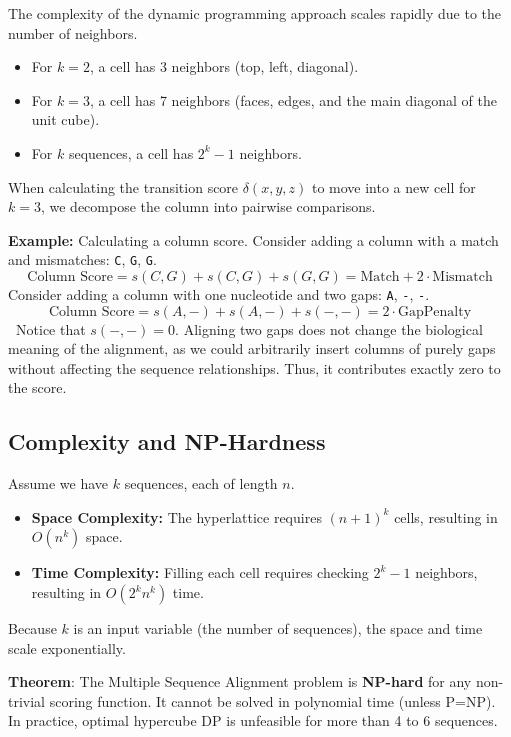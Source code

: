 \documentclass[11pt, a4paper]{article}
\newcommand{\sta}{\textbf{\sffamily [CRITICAL / EXAM]\ }}
\newenvironment{important}
  {\begin{tcolorbox}[colback=blue!5!white, colframe=blue!75!black, arc=1mm, boxrule=1pt]}
  {\end{tcolorbox}}
\begin{document}
The complexity of the dynamic programming approach scales rapidly due to the number of neighbors.
\begin{itemize}
    \item For $k=2$, a cell has 3 neighbors (top, left, diagonal).
    \item For $k=3$, a cell has 7 neighbors (faces, edges, and the main diagonal of the unit cube).
    \item For $k$ sequences, a cell has $2^k - 1$ neighbors.
\end{itemize}

When calculating the transition score $\delta(x, y, z)$ to move into a new cell for $k=3$, we decompose the column into pairwise comparisons. 

\textbf{Example:} Calculating a column score.
Consider adding a column with a match and mismatches: \texttt{C}, \texttt{G}, \texttt{G}. 
\[
\text{Column Score} = s(C,G) + s(C,G) + s(G,G) = \text{Match} + 2 \cdot \text{Mismatch}
\]
Consider adding a column with one nucleotide and two gaps: \texttt{A}, \texttt{-}, \texttt{-}.
\[
\text{Column Score} = s(A,-) + s(A,-) + s(-,-) = 2 \cdot \text{GapPenalty}
\]
\sta Notice that $s(-,-) = 0$. Aligning two gaps does not change the biological meaning of the alignment, as we could arbitrarily insert columns of purely gaps without affecting the sequence relationships. Thus, it contributes exactly zero to the score.

\subsection{Complexity and NP-Hardness}

Assume we have $k$ sequences, each of length $n$.
\begin{itemize}
    \item \textbf{Space Complexity:} The hyperlattice requires $(n+1)^k$ cells, resulting in $O(n^k)$ space.
    \item \textbf{Time Complexity:} Filling each cell requires checking $2^k - 1$ neighbors, resulting in $O(2^k n^k)$ time.
\end{itemize}

Because $k$ is an input variable (the number of sequences), the space and time scale exponentially. 

\begin{important}
  \textbf{Theorem}: The Multiple Sequence Alignment problem is \textbf{NP-hard} for any non-trivial scoring function. It cannot be solved in polynomial time (unless P=NP). In practice, optimal hypercube DP is unfeasible for more than 4 to 6 sequences.
\end{important}
\end{document}

